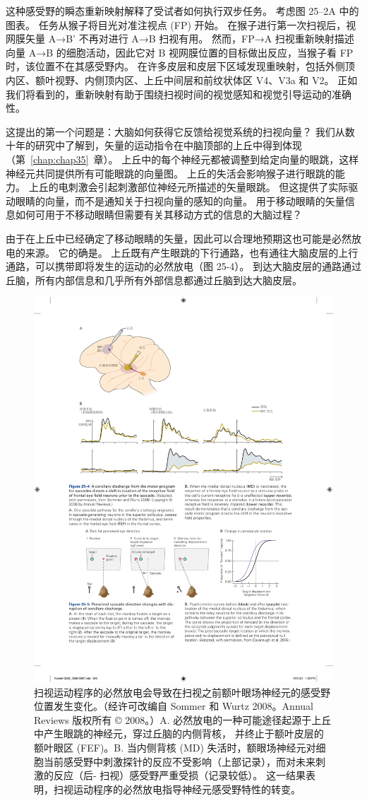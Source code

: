 这种感受野的瞬态重新映射解释了受试者如何执行双步任务。
考虑图 25–2A 中的图表。
任务从猴子将目光对准注视点 (FP) 开始。
在猴子进行第一次扫视后，视网膜矢量 A→B' 不再对进行 A→B 扫视有用。
然而，FP→A 扫视重新映射描述向量 A→B 的细胞活动，因此它对 B 视网膜位置的目标做出反应，当猴子看 FP 时，该位置不在其感受野内。
在许多皮层和皮层下区域发现重映射，包括外侧顶内区、额叶视野、内侧顶内区、上丘中间层和前纹状体区 V4、V3a 和 V2。
正如我们将看到的，重新映射有助于围绕扫视时间的视觉感知和视觉引导运动的准确性。


这提出的第一个问题是：大脑如何获得它反馈给视觉系统的扫视向量？
我们从数十年的研究中了解到，矢量的运动指令在中脑顶部的上丘中得到体现（第~\ref{chap:chap35}~章）。
上丘中的每个神经元都被调整到给定向量的眼跳，这样神经元共同提供所有可能眼跳的向量图。
上丘的失活会影响猴子进行眼跳的能力。
上丘的电刺激会引起刺激部位神经元所描述的矢量眼跳。 
但这提供了实际驱动眼睛的向量，而不是通知关于扫视向量的感知的向量。
用于移动眼睛的矢量信息如何可用于不移动眼睛但需要有关其移动方式的信息的大脑过程？


由于在上丘中已经确定了移动眼睛的矢量，因此可以合理地预期这也可能是必然放电的来源。
它的确是。
上丘既有产生眼跳的下行通路，也有通往大脑皮层的上行通路，可以携带即将发生的运动的必然放电（图 25-4）。
到达大脑皮层的通路通过丘脑，所有内部信息和几乎所有外部信息都通过丘脑到达大脑皮层。


\begin{figure}[htbp]
	\centering
	\includegraphics[width=0.8\linewidth]{chap25/fig_25_4}
	\caption{扫视运动程序的必然放电会导致在扫视之前额叶眼场神经元的感受野位置发生变化。（经许可改编自 Sommer 和 Wurtz 2008。Annual Reviews 版权所有 © 2008。）A. 必然放电的一种可能途径起源于上丘中产生眼跳的神经元，穿过丘脑的内侧背核， 并终止于额叶皮层的额叶眼区 (FEF)。B. 当内侧背核 (MD) 失活时，额眼场神经元对细胞当前感受野中刺激探针的反应不受影响（上部记录），而对未来刺激的反应（后- 扫视）感受野严重受损（记录较低）。 这一结果表明，扫视运动程序的必然放电指导神经元感受野特性的转变。}
	\label{fig:25_4}
\end{figure}


